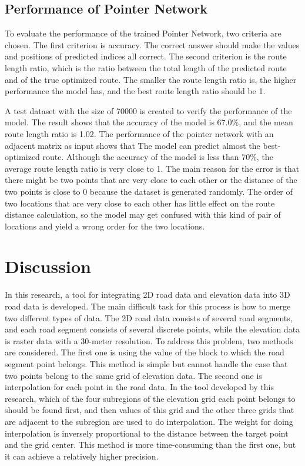 \documentclass[final-report]{report-template}
\begin{document}
\subsection{Performance of Pointer Network}
To evaluate the performance of the trained Pointer Network, two criteria are chosen. 
The first criterion is accuracy. 
The correct answer should make the values and positions of predicted indices all correct.
The second criterion is the route length ratio, 
which is the ratio between the total length of the predicted route and of the true optimized route.
The smaller the route length ratio is, the higher performance the model has, 
and the best route length ratio should be 1.

A test dataset with the size of 70000 is created to verify the performance of the model. 
The result shows that the accuracy of the model is 67.0\%,
and the mean route length ratio is 1.02.
The performance of the pointer network with an adjacent matrix as input shows that 
The model can predict almost the best-optimized route. 
Although the accuracy of the model is less than 70\%, the average route length ratio is very close to 1.
The main reason for the error is that there might be two points that are very close to each other 
or the distance of the two points is close to 0 because the dataset is generated randomly.
The order of two locations that are very close to each other has little effect on the route distance calculation, 
so the model may get confused with this kind of pair of locations and yield a wrong order for the two locations.

\section {Discussion}
In this research, a tool for integrating 2D road data and elevation data into 3D road data is developed.
The main difficult task for this process is how to merge two different types of data.
The 2D road data consists of several road segments, and each road segment consists of several discrete points, 
while the elevation data is raster data with a 30-meter resolution. 
To address this problem, two methods are considered. 
The first one is using the value of the block to which the road segment point belongs. 
This method is simple but cannot handle the case that two points belong to the same grid of elevation data.
The second one is interpolation for each point in the road data. In the tool developed by this research, 
which of the four subregions of the elevation grid each point belongs to should be found first, 
and then values of this grid and the other three grids that are adjacent to the subregion are used to do interpolation.
The weight for doing interpolation is inversely proportional to the distance between the target point and the grid center.
This method is more time-consuming than the first one, but it can achieve a relatively higher precision.
\end{document}
